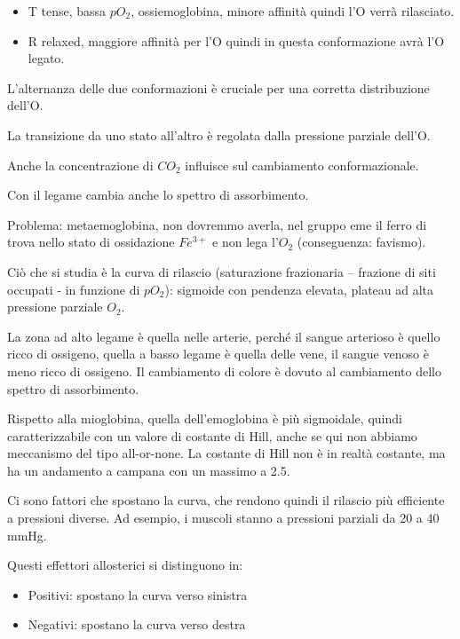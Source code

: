 \begin{itemize}
\item
  T tense, bassa \(pO_{2}\), ossiemoglobina, minore affinità quindi l'O
  verrà rilasciato.
\item
  R relaxed, maggiore affinità per l'O quindi in questa conformazione
  avrà l'O legato.
\end{itemize}

L'alternanza delle due conformazioni è cruciale per una corretta
distribuzione dell'O.

La transizione da uno stato all'altro è regolata dalla pressione
parziale dell'O.

Anche la concentrazione di \(CO_{2}\) influisce sul cambiamento
conformazionale.

Con il legame cambia anche lo spettro di assorbimento.

Problema: metaemoglobina, non dovremmo averla, nel gruppo eme il ferro
di trova nello stato di ossidazione \(Fe^{3 +}\) e non lega l'\(O_{2}\)
(conseguenza: favismo).

Ciò che si studia è la curva di rilascio (saturazione frazionaria --
frazione di siti occupati - in funzione di \(pO_{2}\)): sigmoide con
pendenza elevata, plateau ad alta pressione parziale \(O_{2}\).

La zona ad alto legame è quella nelle arterie, perché il sangue
arterioso è quello ricco di ossigeno, quella a basso legame è quella
delle vene, il sangue venoso è meno ricco di ossigeno. Il cambiamento di
colore è dovuto al cambiamento dello spettro di assorbimento.

Rispetto alla mioglobina, quella dell'emoglobina è più sigmoidale,
quindi caratterizzabile con un valore di costante di Hill, anche se qui
non abbiamo meccanismo del tipo all-or-none. La costante di Hill non è
in realtà costante, ma ha un andamento a campana con un massimo a 2.5.

Ci sono fattori che spostano la curva, che rendono quindi il rilascio
più efficiente a pressioni diverse. Ad esempio, i muscoli stanno a
pressioni parziali da 20 a 40 mmHg.

Questi effettori allosterici si distinguono in:

\begin{itemize}
\item
  Positivi: spostano la curva verso sinistra
\item
  Negativi: spostano la curva verso destra
\end{itemize}

